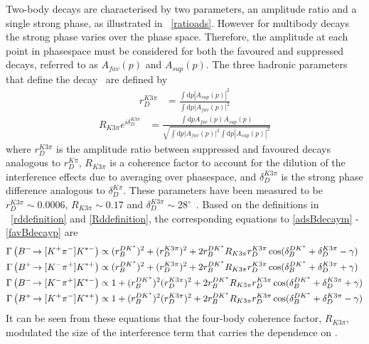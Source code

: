 Two-body \decay{\D}{\Kmp\pipm} decays are characterised by two parameters, an amplitude ratio and a single strong phase, as illustrated in \eqn~\ref{ratioads}. However for multibody \decay{\D}{\Kmp\pipm\pimp\pipm} decays the strong phase varies over the phase space. Therefore, the amplitude at each point in phasespace must be considered for both the \decay{\D}{\Km\pip\pim\pip} favoured and \decay{\Dz}{\Kp\pim\pip\pim} suppressed decays, referred to as $A_{fav}(p)$ and $A_{sup}(p)$. The three hadronic parameters that define the  \decay{\D}{\Km\pip\pim\pip} decay~\cite{charmk3pi,charmk3pi_errata,LHCb-PAPER-2015-057} are defined by
\begin{align}
r_D^{K3\pi} &= \frac{\int \mathrm{d}p \left|A_{sup}(p)\right|^2}{\int \mathrm{d}p \left|A_{fav}(p)\right|^2}
\label{rddefinition}
\end{align}
\begin{align}
R_{K3\pi} e^{i\delta_D^{K3\pi}} &= \frac{\int \mathrm{d}p A_{fav}(p)A_{sup}(p)}{\sqrt{\int \mathrm{d}p \left|A_{fav}(p)\right|^2 \int \mathrm{d}p \left|A_{sup}(p)\right|^2}}
\label{Rddefinition}
\end{align}
where $r_D^{K3\pi}$ is the amplitude ratio between suppressed and favoured \decay{\D}{\Km\pip\pim\pip} decays analogous to $r_D^{K\pi}$, $R_{K3\pi}$ is a coherence factor to account for the dilution of the interference effects due to averaging over phasespace, and $\delta_D^{K3\pi}$ is the strong phase difference analogous to $\delta_D^{K\pi}$. These parameters have been measured to be $r_D^{K3\pi} \sim 0.0006$, $R_{K3\pi} \sim 0.17$ and $\delta_D^{K3\pi} \sim 28^{\circ}$~\cite{charmk3pi,charmk3pi_errata,LHCb-PAPER-2015-057}. Based on the definitions in \eqn~\ref{rddefinition} and \ref{Rddefinition}, the corresponding equations to \eqn\ref{adsBdecaym} - \ref{favBdecayp} are
\begin{align}
\Gamma\left({{{B}^-}}\!\rightarrow [{{K}^+}{{\pi}^-}]{\ensuremath{{K}^{*-}}}\right) &\propto (r_B^{DK^*})^2 + (r_D^{K3\pi})^2 + 2r_B^{DK^*}R_{K3\pi}r_D^{K3\pi}\cos(\delta_B^{DK^*} + \delta_D^{K3\pi} - \gamma) \label{adsBdecaym4body} \\
\Gamma\left({{{B}^+}}\!\rightarrow [{{K}^-}{{\pi}^+}]{\ensuremath{{K}^{*+}}}\right) &\propto (r_B^{DK^*})^2 + (r_D^{K3\pi})^2 + 2r_B^{DK^*}R_{K3\pi}r_D^{K3\pi}\cos(\delta_B^{DK^*} + \delta_D^{K3\pi} + \gamma) \label{adsBdecayp4body} \\
\Gamma\left({{{B}^-}}\!\rightarrow [{{K}^-}{{\pi}^+}]{\ensuremath{{K}^{*-}}}\right) &\propto 1 + (r_B^{DK^*})^2(r_D^{K3\pi})^2 + 2r_B^{DK^*}R_{K3\pi}r_D^{K3\pi}\cos(\delta_B^{DK^*} + \delta_D^{K3\pi} + \gamma) \label{favBdecaym4body} \\
\Gamma\left({{{B}^+}}\!\rightarrow [{{K}^+}{{\pi}^-}]{\ensuremath{{K}^{*+}}}\right) &\propto 1 + (r_B^{DK^*})^2(r_D^{K3\pi})^2 + 2r_B^{DK^*}R_{K3\pi}r_D^{K3\pi}\cos(\delta_B^{DK^*} + \delta_D^{K3\pi} - \gamma) \label{favBdecayp4body} 
\end{align}
It can be seen from these equations that the four-body coherence factor, $R_{K3\pi}$, modulated the size of the interference term that carries the dependence on \Pgamma.

